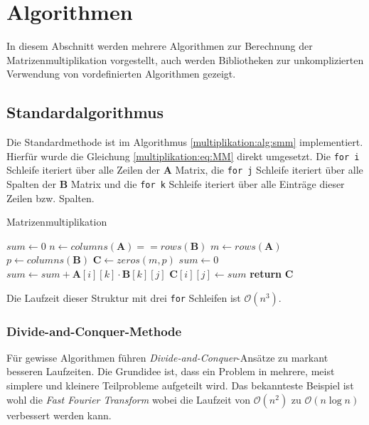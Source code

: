 %
%
%

\section{Algorithmen}

In diesem Abschnitt werden mehrere Algorithmen zur Berechnung der Matrizenmultiplikation vorgestellt, auch werden Bibliotheken zur unkomplizierten Verwendung von vordefinierten Algorithmen gezeigt.

\subsection{Standardalgorithmus}

Die Standardmethode ist im Algorithmus \ref{multiplikation:alg:smm} implementiert.
Hierf\"ur wurde die Gleichung \eqref{multiplikation:eq:MM} direkt umgesetzt.
Die \texttt{for i} Schleife iteriert \"uber alle Zeilen der $\mathbf{A}$ Matrix, die \texttt{for j} Schleife iteriert \"uber alle Spalten der $\mathbf{B}$ Matrix und die \texttt{for k} Schleife iteriert \"uber alle Eintr\"age dieser Zeilen bzw. Spalten.
\begin{algorithm}\footnotesize\caption{Matrizenmultiplikation}
	\label{multiplikation:alg:smm}
	\setlength{\lineskip}{7pt}
	\begin{algorithmic}[1]
		\State $sum \gets 0$
		\State $n \gets columns(\textbf{A}) == rows(\textbf{B})$
		\State $m \gets rows(\textbf{A})$
		\State $p \gets columns(\textbf{B})$
		\State $\textbf{C} \gets zeros(m,p)$
		\State $sum \gets 0$
		\State $sum \gets  sum + \textbf{A}[i][k] \cdot \textbf{B}[k][j]$
		\EndFor
		\State $\textbf{C}[i][j] \gets  sum $
		\EndFor
		\EndFor
		\State \textbf{return} $\textbf{C}$
		\EndFunction
	\end{algorithmic}
\end{algorithm}
Die Laufzeit dieser Struktur mit drei \texttt{for} Schleifen ist $\mathcal{O} (n^3)$.

\subsubsection{Divide-and-Conquer-Methode}
F\"ur gewisse Algorithmen f\"uhren \textit{Divide-and-Conquer}-Ans\"atze \cite{multiplikation:DAC} zu markant besseren Laufzeiten.
Die Grundidee ist, dass ein Problem in mehrere, meist simplere und kleinere Teilprobleme aufgeteilt wird.
%
Das bekannteste Beispiel ist wohl die \textit{Fast Fourier Transform} wobei die Laufzeit von $\mathcal{O} (n^2)$ zu $\mathcal{O}(n \log n)$ verbessert werden kann.
%

